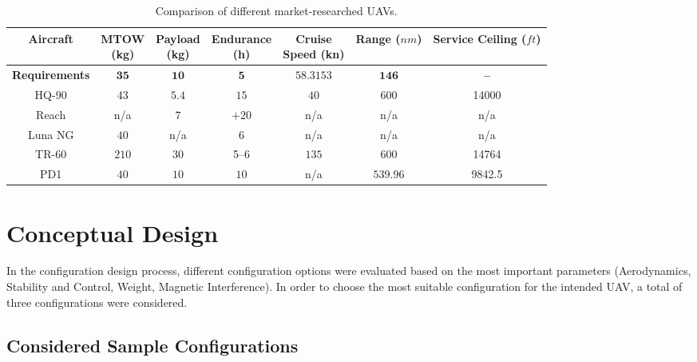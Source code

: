 \documentclass[english,fira]{ist-report}
\begin{document}
\begin{table}[ht]
    \centering
	\begin{tabular}{c c c c c c c}\toprule
		Aircraft
			& \makecell{MTOW\\(\si{\kilogram})}
			& \makecell{Payload\\(\si{\kilogram})}
			& \makecell{Endurance\\(\si{\hour})}
			& \makecell{Cruise\\Speed (\si{\knot})}
			& \makecell{Range\\($nm$)}
			& \makecell{Service\\Ceiling ($ft$)}	\\
		\midrule
		\textbf{Requirements}	& $\mathbf{35}$	& $\mathbf{10}$	& $\mathbf{5}$	& $\mathbf{58.3153}$	& $\mathbf{146}$	& \textbf{--}								\\
		HQ-90					& $43$			& $5.4$			& $15$			& $40$					& $600$				& \num[group-separator = \text{~}]{14000}	\\
		Reach					& n/a			& $7$			& $+20$			& n/a					& n/a				& n/a										\\
		Luna NG					& $40$			& n/a			& $6$			& n/a					& n/a				& n/a										\\
		TR-60					& $210$			& $30$			&
											\numrange[range-phrase = --]{5}{6}	& $135$					& $600$				& \num[group-separator = \text{~}]{14764}	\\
		PD1						& $40$			& $10$			& $10$			& n/a					& $539.96$			& \num[group-separator = \text{~}]{9842.5}	\\
		\bottomrule
	\end{tabular}
	\caption{Comparison of different market-researched UAVs.}
	\label{tab:uavs_comp}
\end{table}




\chapter{Conceptual Design}

In the configuration design process, different configuration options were evaluated based on the most important parameters (Aerodynamics, Stability and Control, Weight, Magnetic Interference). In order to choose the most suitable configuration for the intended UAV, a total of three configurations were considered.

\section{Considered Sample Configurations}
\end{document}
